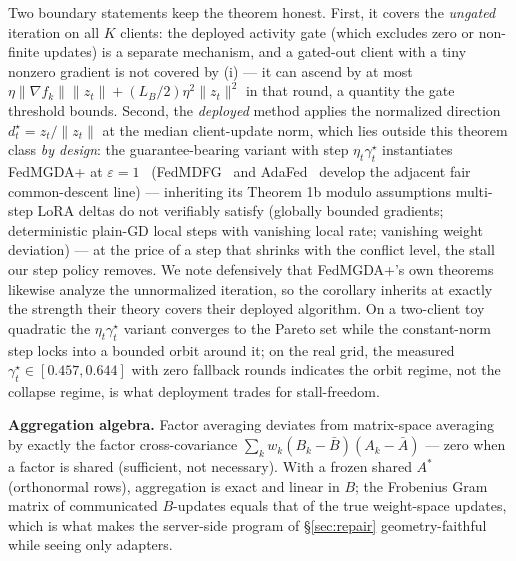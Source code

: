 \documentclass[sigconf,anonymous,review]{acmart}
\begin{document}
Two boundary statements keep the theorem honest. First, it covers the \emph{ungated} iteration on all $K$ clients: the deployed activity gate (which excludes zero or non-finite updates) is a separate mechanism, and a gated-out client with a tiny nonzero gradient is not covered by (i) --- it can ascend by at most $\eta\lVert\nabla f_k\rVert\lVert z_t\rVert + (L_B/2)\eta^2\lVert z_t\rVert^2$ in that round, a quantity the gate threshold bounds. Second, the \emph{deployed} method applies the normalized direction $d^\star_t = z_t/\lVert z_t\rVert$ at the median client-update norm, which lies outside this theorem class \emph{by design}: the guarantee-bearing variant with step $\eta_t\gamma^\star_t$ instantiates FedMGDA+ at $\varepsilon{=}1$~\cite{hu2020fedmgda} (FedMDFG~\cite{pan2023fedmdfg} and AdaFed~\cite{hamidi2024adafed} develop the adjacent fair common-descent line) --- inheriting its Theorem 1b modulo assumptions multi-step LoRA deltas do not verifiably satisfy (globally bounded gradients; deterministic plain-GD local steps with vanishing local rate; vanishing weight deviation) --- at the price of a step that shrinks with the conflict level, the stall our step policy removes. We note defensively that FedMGDA+'s own theorems likewise analyze the unnormalized iteration, so the corollary inherits at exactly the strength their theory covers their deployed algorithm. On a two-client toy quadratic the $\eta_t\gamma^\star_t$ variant converges to the Pareto set while the constant-norm step locks into a bounded orbit around it; on the real grid, the measured $\gamma^\star_t \in [0.457, 0.644]$ with zero fallback rounds indicates the orbit regime, not the collapse regime, is what deployment trades for stall-freedom.

\textbf{Aggregation algebra.} Factor averaging deviates from matrix-space averaging by exactly the factor cross-covariance $\sum_k w_k (B_k-\bar B)(A_k-\bar A)$ --- zero when a factor is shared (sufficient, not necessary). With a frozen shared $A^\ast$ (orthonormal rows), aggregation is exact and linear in $B$; the Frobenius Gram matrix of communicated $B$-updates equals that of the true weight-space updates, which is what makes the server-side program of \S\ref{sec:repair} geometry-faithful while seeing only adapters.
\end{document}
